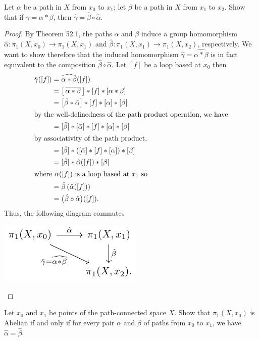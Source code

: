 \begin{problem}[Munkres \S52, Ex.\,2]
Let $\alpha$ be a path in $X$ from $x_0$ to $x_1$; let $\beta$ be
a path in $X$ from $x_1$ to $x_2$. Show that if
$\gamma=\alpha*\beta$, then $\hat\gamma=\hat\beta\circ\hat\alpha$.
\end{problem}
\begin{proof}
By Theorem 52.1, the paths $\alpha$ and $\beta$ induce a group homomorphism
$\hat\alpha\colon\pi_1(X,x_0)\to\pi_1(X,x_1)$ and
$\hat\beta\colon\pi_1(X,x_1)\to\pi_1(X,x_2)$, respectively. We want to
show therefore that the induced homomorphism
$\hat\gamma=\widehat{\alpha*\beta}$ is in fact equivalent to the
composition $\hat\beta\circ\hat\alpha$. Let $[f]$ be a loop based at $x_0$
then
\begin{align*}
\hat\gamma([f])&=\widehat{\alpha*\beta}([f])\\
               &=\bigl[\,\overline{\alpha*\beta}\,\bigr]*[f]*[\alpha*\beta]\\
               &=\bigl[\bar\beta*\bar\alpha\bigr]*[f]*[\alpha]*[\beta]\\
\shortintertext{by the well-definedness of the path product operation, we have}
               &=[\bar\beta]*[\bar\alpha]*[f]*[\alpha]*[\beta]\\
\shortintertext{by associativity of the path product,}
               &=[\bar\beta]*([\bar\alpha]*[f]*[\alpha])*[\beta]\\
               &=[\bar\beta]*\hat\alpha([f])*[\beta]\\
\shortintertext{where $\alpha([f])$ is a loop based at $x_1$ so}
               &=\hat\beta\left(\hat\alpha([f])\right)\\
               &=\bigl(\hat\beta\circ\hat\alpha\bigr)([f]).
\end{align*}
Thus, the following diagram commutes
\begin{center}
\includegraphics{figures/hw-10-pi-1-path-diagram}
\end{center}
\end{proof}
\newpage
\begin{problem}[Munkres \S52, Ex.\,3]
Let $x_0$ and $x_1$ be points of the path-connected space
$X$. Show that $\pi_1(X,x_0)$ is Abelian if and only if for every
pair $\alpha$ and $\beta$ of paths from $x_0$ to $x_1$, we have
$\hat\alpha=\hat\beta$.
\end{problem}
